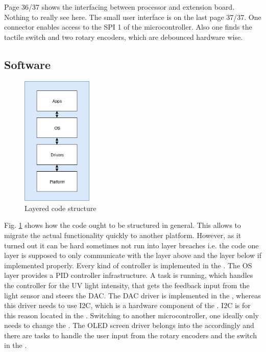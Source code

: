 \newpar 
Page 36/37 shows the interfacing between processor and extension board. Nothing to really see here. 
\newpar 
The small user interface is on the last page 37/37. One connector enables access to the \gls{SPI} 1 of the microcontroller. Also one finds the tactile switch and two rotary encoders, which are debounced hardware wise. 

\subsection{Software}
\label{subsec:uv_light_sw}

\begin{figure}[H]                                                         
\centering          
\includegraphics[width=0.3\textwidth]{./fig/layering}   
\caption[Layered code structure]{Layered code structure}   
\label{fig:layering}                                                       
\end{figure}

Fig. \ref{fig:layering} shows how the code ought to be structured in general. This allows to migrate the actual functionality quickly to another platform. However, as it turned out it can be hard sometimes not run into layer breaches i.e. the code one layer is supposed to only communicate with the layer above and the layer below if implemented properly.  
\newpar 
Every kind of controller is implemented in the . The \gls{OS} layer provides a \gls{PID} controller infrastructure. A task is running, which handles the controller for the \gls{UV} light intensity, that gets the feedback input from the light sensor and steers the \gls{DAC}.
\newpar 
The \gls{DAC} driver is implemented in the , whereas this driver needs to use \gls{I2C}, which is a hardware component of the . \gls{I2C} is for this reason located in the . Switching to another microcontroller, one ideally only needs to change the . 
\newpar 
The \gls{OLED} screen driver belongs into the  accordingly and there are tasks to handle the user input from the rotary encoders and the switch in the .  

